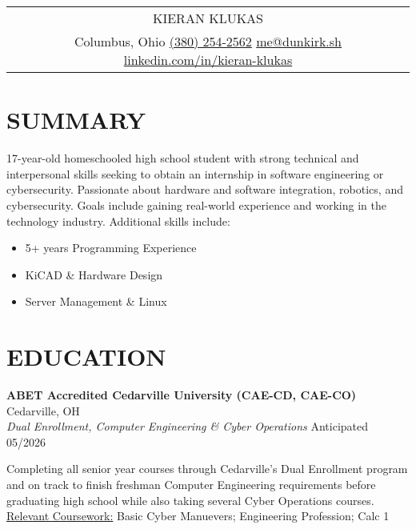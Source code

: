 \documentclass[a4paper,10pt]{article}
\begin{document}
\pagestyle{empty}


\begin{tabularx}{\linewidth}{@{} C @{}}
\Huge{KIERAN KLUKAS} \\[8pt]
Columbus, Ohio \textbar{} \href{tel:3802542562}{(380) 254-2562} \textbar{} \href{mailto:me@dunkirk.sh}{me@dunkirk.sh} \textbar{} \href{https://linkedin.com/in/kieran-klukas}{linkedin.com/in/kieran-klukas}
\end{tabularx}

\section{SUMMARY}
17-year-old homeschooled high school student with strong technical and interpersonal skills seeking to obtain an internship in software engineering or cybersecurity. Passionate about hardware and software integration, robotics, and cybersecurity. Goals include gaining real-world experience and working in the technology industry. Additional skills include:
\begin{itemize}[nosep,leftmargin=1em, itemsep=3pt,label=$\bullet$]
\item 5+ years Programming Experience
\item KiCAD \& Hardware Design
\item Server Management \& Linux
\end{itemize}

\section{EDUCATION}

\textbf{ABET Accredited Cedarville University (CAE-CD, CAE-CO)} \hfill Cedarville, OH\\
\textit{Dual Enrollment, Computer Engineering \& Cyber Operations} \hfill Anticipated 05/2026\\
\begin{minipage}{0.8\textwidth}
Completing all senior year courses through Cedarville's Dual Enrollment program and on track to finish freshman Computer Engineering requirements before graduating high school while also taking several Cyber Operations courses.\\
\underline{Relevant Coursework:} Basic Cyber Manuevers; Engineering Profession; Calc 1
\end{minipage}
\end{document}
